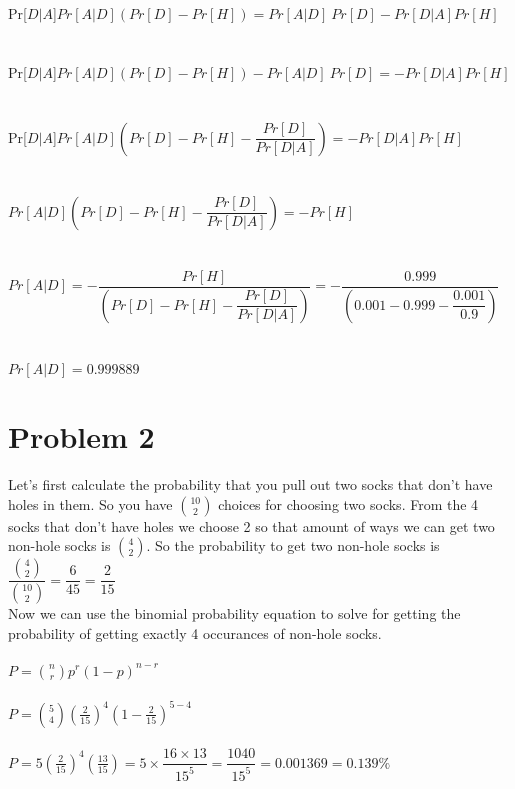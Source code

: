 \documentclass[11pt,letterpaper]{article}
\begin{document}
\begin{enumerate}[(a)]
Pr[$D|A$]$Pr[A|D](Pr[D] - Pr[H]) = Pr[A|D]~Pr[D] - Pr[D|A]Pr[H]$\\\\\\
Pr[$D|A$]$Pr[A|D](Pr[D] - Pr[H])  -Pr[A|D]~Pr[D] =  - Pr[D|A]Pr[H]$\\\\\\
Pr[$D|A$]$Pr[A|D](Pr[D] - Pr[H] - \dfrac{Pr[D]}{Pr[D|A]})   =  - Pr[D|A]Pr[H]$\\\\\\
$Pr[A|D](Pr[D] - Pr[H] - \dfrac{Pr[D]}{Pr[D|A]})   =  -Pr[H]$\\\\\\
$Pr[A|D]   =  -\dfrac{Pr[H]}{(Pr[D] - Pr[H] - \dfrac{Pr[D]}{Pr[D|A]})}
=-\dfrac{0.999}{(0.001 - 0.999 - \dfrac{0.001}{0.9})}$\\\\\\
$Pr[A|D] = 0.999889$

\end{enumerate}
\clearpage
\section*{Problem 2} %

Let's first calculate the probability that you pull out two socks that don't have holes in them. So you have ${10\choose 2}$ choices for choosing two socks. From the 4 socks that don't have holes we choose 2 so that amount of ways we can get two non-hole socks is ${4\choose 2}$. So the probability to get two non-hole socks is $\dfrac{{4\choose2}}{{10\choose 2}} = \dfrac{6}{45} = \dfrac{2}{15}$ \\
Now we can use the binomial probability equation to solve for getting the probability of getting exactly 4 occurances of non-hole socks.\\\\

$P={n\choose r}p^r(1-p)^{n-r}$\\\\
$P={5\choose 4}(\frac{2}{15})^4(1-\frac{2}{15})^{5-4}$\\\\
$P=5(\frac{2}{15})^4(\frac{13}{15}) = 5\times \dfrac{16\times13}{15^{5}} = \dfrac{1040}{15^5} = 0.001369 = 0.139\%$\\\\
\clearpage
\end{document}
